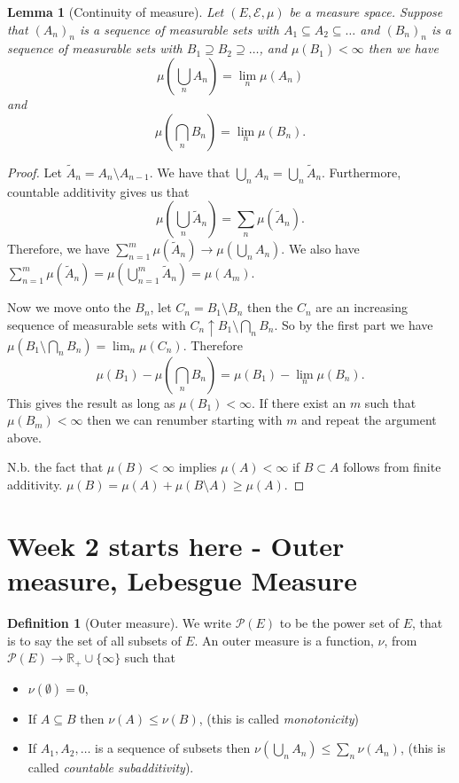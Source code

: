 \documentclass[11pt]{article}
\newtheorem{lem}[thm]{Lemma}
\theoremstyle{definition}
\newtheorem{dfn}[thm]{Definition}
\theoremstyle{remark}
\begin{document}
\begin{lem}[Continuity of measure]
Let $(E, \mathcal{E}, \mu)$ be a measure space. Suppose that $(A_n)_n$ is a sequence of measurable sets with $A_1 \subseteq A_2 \subseteq \dots$ and $(B_n)_n$ is a sequence of measurable sets with $B_1 \supseteq B_2 \supseteq \dots$, and $\mu(B_1)< \infty$ then we have
\[ \mu\left( \bigcup_n A_n\right) = \lim_n \mu(A_n) \] and \[ \mu\left( \bigcap_n B_n \right) = \lim_n \mu(B_n). \]
\end{lem}
\begin{proof}
Let $\tilde{A}_n = A_n \setminus A_{n-1}$. We have that $\bigcup_n A_n = \bigcup_n \tilde{A}_n$. Furthermore, countable additivity gives us that
\[ \mu\left( \bigcup_n \tilde{A}_n \right) = \sum_n \mu(\tilde{A}_n). \] Therefore, we have $\sum_{n=1}^m \mu(\tilde{A}_n) \rightarrow \mu \left( \bigcup_n A_n \right)$. We also have $\sum_{n=1}^m \mu(\tilde{A}_n) = \mu \left( \bigcup_{n=1}^m \tilde{A}_n \right) = \mu (A_m)$.

Now we move onto the $B_n$, let $C_n = B_1 \setminus B_n$ then the $C_n$ are an increasing sequence of measurable sets with $C_n \uparrow B_1 \setminus \bigcap_n B_n$. So by the first part we have $\mu\left(B_1 \setminus \bigcap_n B_n \right) = \lim_n \mu(C_n)$. Therefore
\[ \mu(B_1) - \mu\left( \bigcap_n B_n \right) = \mu(B_1) - \lim_n \mu(B_n). \] This gives the result as long as $\mu(B_1) < \infty$. If there exist an $m$ such that $\mu(B_m) < \infty$ then we can renumber starting with $m$ and repeat the argument above. 

N.b. the fact that $\mu(B)< \infty$ implies $\mu(A)< \infty$ if $B \subset A$ follows from finite additivity. $\mu(B) = \mu(A) + \mu(B \setminus A) \geq \mu(A)$.
\end{proof}

\section{Week 2 starts here - Outer measure, Lebesgue Measure}

\begin{dfn}[Outer measure]
We write $\mathscr{P}(E)$ to be the power set of $E$, that is to say the set of all subsets of $E$. An outer measure is a function, $\nu$, from $\mathscr{P}(E) \rightarrow \mathbb{R}_+ \cup \{\infty\}$ such that
\begin{itemize}
\item $\nu(\emptyset) =0$,
\item If $A \subseteq B$ then $\nu (A) \leq \nu(B)$, (this is called \emph{monotonicity})
\item If $A_1, A_2, \dots$ is a sequence of subsets then $\nu\left( \bigcup_n A_n \right) \leq \sum_n \nu(A_n)$, (this is called \emph{countable subadditivity}).
\end{itemize}
\end{dfn}
\end{document}

